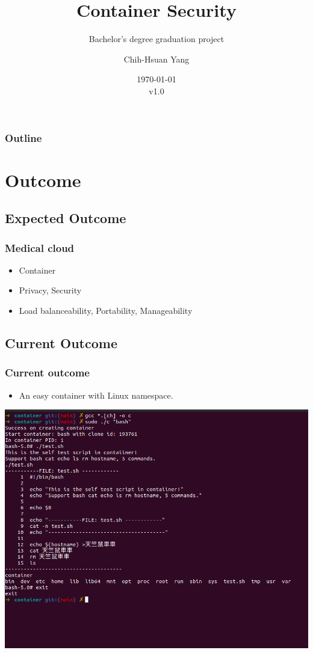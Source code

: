 \documentclass{beamer}
\title{Container Security}
\subtitle{Bachelor's degree graduation project}
\author{Chih-Hsuan Yang}
\institute{National Sun Yat-sen University}
\date{\today\\v1.0}
\begin{document}
\begin{frame}
    \titlepage
\end{frame}

\begin{frame}
    \frametitle{Outline}
    \tableofcontents
\end{frame}

\section{Outcome}
\subsection{Expected Outcome}
\begin{frame}
    \frametitle{Medical cloud}
    \begin{itemize}
        \item Container
        \item Privacy, Security
        \item Load balanceability, Portability, Manageability
    \end{itemize}
\end{frame}

\subsection{Current Outcome}
\begin{frame}
    \frametitle{Current outcome}
    \begin{itemize}
        \item An easy container with Linux namespace.
    \end{itemize}
    \centering\includegraphics[width=1.0\textwidth]{cur_cont.png}
\end{frame}
\end{document}
